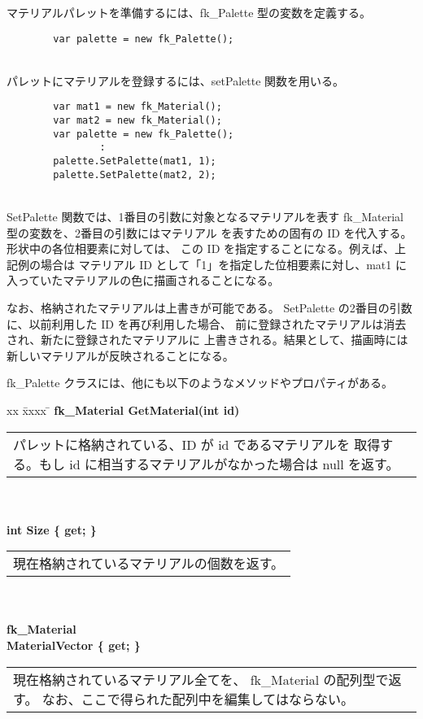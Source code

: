 マテリアルパレットを準備するには、fk\_Palette 型の変数を定義する。
\\
\begin{screen}
\begin{verbatim}
        var palette = new fk_Palette();
\end{verbatim}
\end{screen}
~ \\
パレットにマテリアルを登録するには、setPalette 関数を用いる。
\\
\begin{screen}
\begin{verbatim}
        var mat1 = new fk_Material();
        var mat2 = new fk_Material();
        var palette = new fk_Palette();
                :
        palette.SetPalette(mat1, 1);
        palette.SetPalette(mat2, 2);
\end{verbatim}
\end{screen}
~ \\
SetPalette 関数では、1番目の引数に対象となるマテリアルを表す
fk\_Material 型の変数を、2番目の引数にはマテリアル
を表すための固有の ID を代入する。形状中の各位相要素に対しては、
この ID を指定することになる。例えば、上記例の場合は
マテリアル ID として「1」を指定した位相要素に対し、mat1 に
入っていたマテリアルの色に描画されることになる。

なお、格納されたマテリアルは上書きが可能である。
SetPalette の2番目の引数に、以前利用した ID を再び利用した場合、
前に登録されたマテリアルは消去され、新たに登録されたマテリアルに
上書きされる。結果として、描画時には新しいマテリアルが反映されることになる。

fk\_Palette クラスには、他にも以下のようなメソッドやプロパティがある。
\begin{tabbing}
xx \= xxxx \= \kill
\> \textbf{fk\_Material GetMaterial(int id)} \\
	\> \> \begin{tabular}{p{15cm}}
		パレットに格納されている、ID が id であるマテリアルを
		取得する。もし id に相当するマテリアルがなかった場合は
		null を返す。
	\end{tabular} \\ \\

\> \textbf{int Size \{ get; \} } \\
	\> \> \begin{tabular}{p{15cm}}
		現在格納されているマテリアルの個数を返す。
	\end{tabular} \\ \\

\> \textbf{fk\_Material \[\] MaterialVector \{ get; \} } \\
	\> \> \begin{tabular}{p{15cm}}
		現在格納されているマテリアル全てを、
		fk\_Material の配列型で返す。
		なお、ここで得られた配列中を編集してはならない。
	\end{tabular} \\ \\
\end{tabbing}

